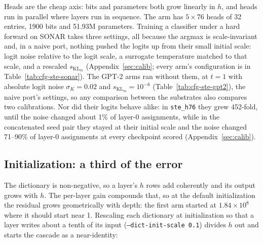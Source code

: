 Heads are the cheap axis: bits and parameters both grow linearly in $h$,
and heads run in parallel where layers run in sequence. The arm has
$5\times76$ heads of 32 entries, 1900 bits and 51.93M parameters.
Training a classifier under a hard forward on SONAR takes three settings,
all because the argmax is scale-invariant and, in a naive port, nothing
pushed the logits up from their small initial scale: logit noise relative
to the logit scale, a surrogate temperature matched to that scale, and a
rescaled $s_{\mathrm{KL}_m}$ (Appendix~\ref{sec:calib}; every arm's
configuration is in Table~\ref{tab:cfg-ste-sonar}). The GPT-2 arms ran
without them, at $t{=}1$ with absolute logit noise $\sigma_K{=}0.02$ and
$s_{\mathrm{KL}_m}{=}10^{-6}$ (Table~\ref{tab:cfg-ste-gpt2}), the naive
port's settings, so any comparison between the substrates also compares
two calibrations. Nor did their logits behave alike: in
\texttt{ste\_h76} they grew 452-fold, until the noise changed about 1\%
of layer-0 assignments, while in the concatenated seed pair they stayed
at their initial scale and the noise changed 71--90\% of layer-0
assignments at every checkpoint scored (Appendix~\ref{sec:calib}).

\subsection{Initialization: a third of the error}

The dictionary is non-negative, so a layer's $h$ rows add coherently and
its output grows with $h$. The per-layer gain compounds that, so at the
default initialization the residual grows geometrically with depth: the
first arm started at $1.84\times10^8$ where it should start near 1.
Rescaling each dictionary at initialization so that a layer writes about
a tenth of its input (\texttt{--dict-init-scale 0.1}) divides $h$ out and
starts the cascade as a near-identity:

